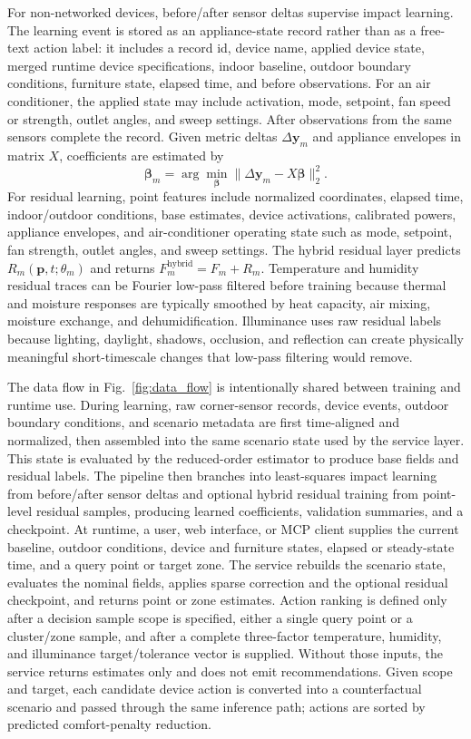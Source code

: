 \documentclass[conference]{IEEEtran}
\begin{document}
For non-networked devices, before/after sensor deltas supervise impact learning. The learning event is stored as an appliance-state record rather than as a free-text action label: it includes a record id, device name, applied device state, merged runtime device specifications, indoor baseline, outdoor boundary conditions, furniture state, elapsed time, and before observations. For an air conditioner, the applied state may include activation, mode, setpoint, fan speed or strength, outlet angles, and sweep settings. After observations from the same sensors complete the record. Given metric deltas $\Delta\mathbf{y}_m$ and appliance envelopes in matrix $X$, coefficients are estimated by
\begin{equation}
\boldsymbol{\beta}_m=\arg\min_{\boldsymbol{\beta}}\|\Delta\mathbf{y}_m-X\boldsymbol{\beta}\|_2^2.
\end{equation}
For residual learning, point features include normalized coordinates, elapsed time, indoor/outdoor conditions, base estimates, device activations, calibrated powers, appliance envelopes, and air-conditioner operating state such as mode, setpoint, fan strength, outlet angles, and sweep settings. The hybrid residual layer predicts $R_m(\mathbf{p},t;\theta_m)$ and returns $F_m^{\mathrm{hybrid}}=F_m+R_m$. Temperature and humidity residual traces can be Fourier low-pass filtered before training because thermal and moisture responses are typically smoothed by heat capacity, air mixing, moisture exchange, and dehumidification. Illuminance uses raw residual labels because lighting, daylight, shadows, occlusion, and reflection can create physically meaningful short-timescale changes that low-pass filtering would remove.

The data flow in Fig.~\ref{fig:data_flow} is intentionally shared between training and runtime use. During learning, raw corner-sensor records, device events, outdoor boundary conditions, and scenario metadata are first time-aligned and normalized, then assembled into the same scenario state used by the service layer. This state is evaluated by the reduced-order estimator to produce base fields and residual labels. The pipeline then branches into least-squares impact learning from before/after sensor deltas and optional hybrid residual training from point-level residual samples, producing learned coefficients, validation summaries, and a checkpoint. At runtime, a user, web interface, or MCP client supplies the current baseline, outdoor conditions, device and furniture states, elapsed or steady-state time, and a query point or target zone. The service rebuilds the scenario state, evaluates the nominal fields, applies sparse correction and the optional residual checkpoint, and returns point or zone estimates. Action ranking is defined only after a decision sample scope is specified, either a single query point or a cluster/zone sample, and after a complete three-factor temperature, humidity, and illuminance target/tolerance vector is supplied. Without those inputs, the service returns estimates only and does not emit recommendations. Given scope and target, each candidate device action is converted into a counterfactual scenario and passed through the same inference path; actions are sorted by predicted comfort-penalty reduction.
\end{document}
